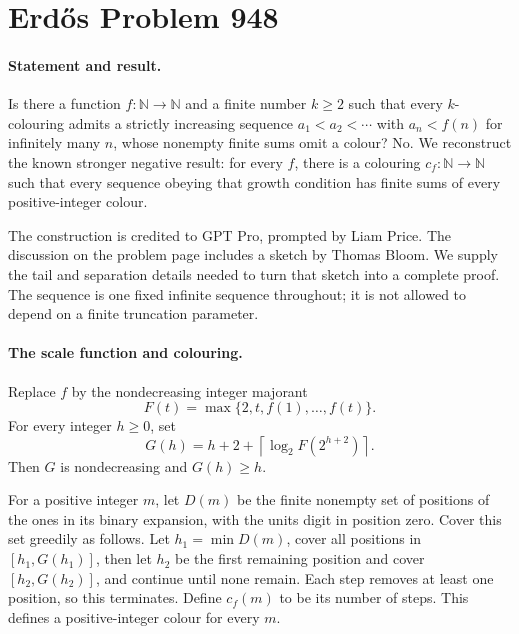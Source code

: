 \section*{Erd\H{o}s Problem 948}

\paragraph{Statement and result.}
Is there a function \(f:\mathbb N\to\mathbb N\) and a finite number \(k\geq2\) such that every \(k\)-colouring admits a strictly increasing sequence \(a_1<a_2<\cdots\) with \(a_n<f(n)\) for infinitely many \(n\), whose nonempty finite sums omit a colour? No. We reconstruct the known stronger negative result: for every \(f\), there is a colouring \(c_f:\mathbb N\to\mathbb N\) such that every sequence obeying that growth condition has finite sums of every positive-integer colour.

The construction is credited to GPT Pro, prompted by Liam Price. The discussion on the problem page includes a sketch by Thomas Bloom. We supply the tail and separation details needed to turn that sketch into a complete proof. The sequence is one fixed infinite sequence throughout; it is not allowed to depend on a finite truncation parameter.

\paragraph{The scale function and colouring.}
Replace \(f\) by the nondecreasing integer majorant
\[
 F(t)=\max\{2,t,f(1),\ldots,f(t)\}.
\]
For every integer \(h\geq0\), set
\[
 G(h)=h+2+\left\lceil\log_2 F(2^{h+2})\right\rceil.
\]
Then \(G\) is nondecreasing and \(G(h)\geq h\).

For a positive integer \(m\), let \(D(m)\) be the finite nonempty set of positions of the ones in its binary expansion, with the units digit in position zero. Cover this set greedily as follows. Let \(h_1=\min D(m)\), cover all positions in \([h_1,G(h_1)]\), then let \(h_2\) be the first remaining position and cover \([h_2,G(h_2)]\), and continue until none remain. Each step removes at least one position, so this terminates. Define \(c_f(m)\) to be its number of steps. This defines a positive-integer colour for every \(m\).

